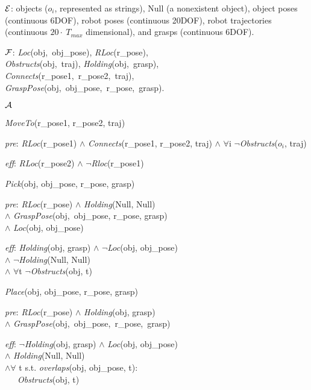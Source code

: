 \begin{tightlist}
\item[$\mathcal{E}$:] objects ($o_i$, represented as strings), Null (a
  nonexistent object), object poses (continuous 6DOF), robot poses
  (continuous 20DOF), robot trajectories (continuous $20\cdot~T_{max}$ dimensional),
  and grasps (continuous 6DOF).
\item[$\mathcal{F}$:] \emph{Loc}(obj,~obj\_pose), \emph{RLoc}(r\_pose),
  \\\emph{Obstructs}(obj,~traj), \emph{Holding}(obj,~grasp),
  \\\emph{Connects}(r\_pose1,~r\_pose2,~traj),
  \\\emph{GraspPose}(obj,~obj\_pose,~r\_pose,~grasp).
\item[$\mathcal{A}$] \begin{tightlist}\item \emph{MoveTo}(r\_pose1, r\_pose2, traj) \begin{tightlist}
\item[\emph{pre}:] \emph{RLoc}(r\_pose1) $\wedge$
  \emph{Connects}(r\_pose1, r\_pose2, traj) $\wedge$ $\forall$i
  $\lnot$\emph{Obstructs}($o_i$, traj)
\item [\emph{eff}:] \emph{RLoc}(r\_pose2) $\wedge$ $\lnot$\emph{Rloc}(r\_pose1)
\end{tightlist}
\item \emph{Pick}(obj, obj\_pose, r\_pose, grasp)
\begin{tightlist}
   \item[\emph{pre}:] \emph{RLoc}(r\_pose) $\wedge$ \emph{Holding}(Null, Null) \\$\wedge$ \emph{GraspPose}(obj,~obj\_pose, r\_pose, grasp) \\$\wedge$ \emph{Loc}(obj, obj\_pose)
   \item[\emph{eff}:] \emph{Holding}(obj, grasp) $\wedge$ $\lnot$\emph{Loc}(obj, obj\_pose) \\$\wedge$ $\lnot$\emph{Holding}(Null, Null) \\$\wedge$ $\forall$t $\lnot$\emph{Obstructs}(obj, t)
\end{tightlist}
\item \emph{Place}(obj, obj\_pose, r\_pose, grasp)
\begin{tightlist}
   \item[\emph{pre}:] \emph{RLoc}(r\_pose) $\wedge$ \emph{Holding}(obj, grasp) \\ $\wedge$ \emph{GraspPose}(obj,~obj\_pose,~r\_pose,~grasp)
   \item[\emph{eff}:] $\lnot$\emph{Holding}(obj, grasp) $\wedge$ \emph{Loc}(obj, obj\_pose) \\$\wedge$ \emph{Holding}(Null, Null)\\ $\wedge \forall$ t s.t. \emph{overlaps}(obj, obj\_pose, t): \\ \indent \indent \ \ \ \emph{Obstructs}(obj, t)
\end{tightlist}
\end{tightlist}
\end{tightlist}
